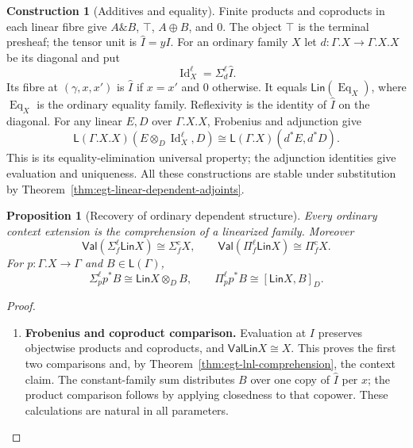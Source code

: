 \documentclass[11pt,a4paper]{article}
\numberwithin{equation}{section}
\newtheorem{proposition}[theorem]{Proposition}
\theoremstyle{definition}
\newtheorem{construction}[construction]{Construction}
\theoremstyle{remark}
\theoremstyle{plain}
\begin{document}
\begin{construction}[Additives and equality]
\label{con:egt-linear-additives-equality}
Finite products and coproducts in each linear fibre give
$A\mathbin{\&}B$, $\top$, $A\oplus B$, and $0$. The object $\top$ is
the terminal presheaf; the tensor unit is $\widehat I=yI$.
For an ordinary family $X$ let
$d:\Gamma.X\to\Gamma.X.X$ be its diagonal and put
\[
 \operatorname{Id}^{\ell}_X=\Sigma_d^\ell \widehat I.
\]
Its fibre at $(\gamma,x,x')$ is $\widehat I$ if $x=x'$ and $0$ otherwise.
It equals $\mathsf{Lin}(\operatorname{Eq}_X)$, where
$\operatorname{Eq}_X$ is the ordinary equality family. Reflexivity is
the identity of $\widehat I$ on the diagonal. For any linear $E,D$ over
$\Gamma.X.X$, Frobenius and adjunction give
\[
 \mathsf L(\Gamma.X.X)(E\otimes_D\operatorname{Id}^{\ell}_X,D)
 \cong\mathsf L(\Gamma.X)(d^*E,d^*D).
\]
This is its equality-elimination universal property; the adjunction
identities give evaluation and uniqueness. All these constructions are
stable under substitution by Theorem~\ref{thm:egt-linear-dependent-adjoints}.
\end{construction}

\begin{proposition}[Recovery of ordinary dependent structure]
\label{prop:egt-ordinary-recovery}
Every ordinary context extension is the comprehension of a linearized
family. Moreover
\[
 \mathsf{Val}(\Sigma_f^\ell\mathsf{Lin}X)
       \cong\Sigma_f^{\mathrm c}X,
 \qquad
 \mathsf{Val}(\Pi_f^\ell\mathsf{Lin}X)
       \cong\Pi_f^{\mathrm c}X.
\]
For $p:\Gamma.X\to\Gamma$ and $B\in\mathsf L(\Gamma)$,
\[
 \Sigma_p^\ell p^*B\cong\mathsf{Lin}X\otimes_D B,
 \qquad
 \Pi_p^\ell p^*B\cong[\mathsf{Lin}X,B]_D.
\]
\end{proposition}
\begin{proof}
\leavevmode
\begin{enumerate}[label=\textup{(\arabic*)},leftmargin=*,itemsep=4pt,topsep=3pt]
  \item \textbf{Frobenius and coproduct comparison.} Evaluation at $I$ preserves objectwise products and coproducts, and
$\mathsf{Val}\mathsf{Lin}X\cong X$. This proves the first two
comparisons and, by Theorem~\ref{thm:egt-lnl-comprehension}, the context
claim. The constant-family sum distributes $B$ over one copy of $\widehat I$
per $x$; the product comparison follows by applying closedness to that
copower. These calculations are natural in all parameters.
\end{enumerate}
\end{proof}
\end{document}
